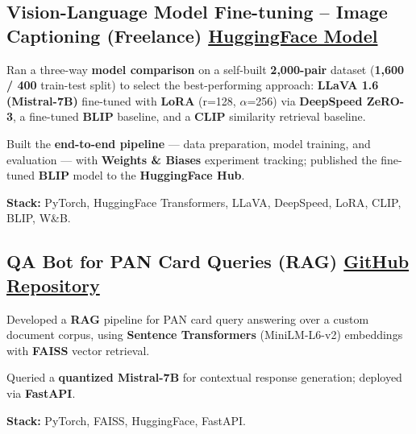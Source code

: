 \documentclass[letter,10pt]{article}
\begin{document}
\subsection{Vision-Language Model Fine-tuning – Image Captioning (Freelance) \hfill \href{https://huggingface.co/sunil448832/blip-model}{HuggingFace Model}}
\begin{zitemize}
\item Ran a three-way \textbf{model comparison} on a self-built \textbf{2{,}000-pair} dataset (\textbf{1{,}600 / 400} train-test split) to select the best-performing approach: \textbf{LLaVA 1.6 (Mistral-7B)} fine-tuned with \textbf{LoRA} (r=128, $\alpha$=256) via \textbf{DeepSpeed ZeRO-3}, a fine-tuned \textbf{BLIP} baseline, and a \textbf{CLIP} similarity retrieval baseline.
\item Built the \textbf{end-to-end pipeline} --- data preparation, model training, and evaluation --- with \textbf{Weights \& Biases} experiment tracking; published the fine-tuned \textbf{BLIP} model to the \textbf{HuggingFace Hub}.
\item \textbf{Stack:} PyTorch, HuggingFace Transformers, LLaVA, DeepSpeed, LoRA, CLIP, BLIP, W\&B.
\end{zitemize}

\subsection{QA Bot for PAN Card Queries (RAG) \hfill \href{https://github.com/sunil448832/Natural-Language-Processing/tree/master/RAG(Retrieval\%20Augment\%20Generation)}{GitHub Repository}}
\begin{zitemize}
\item Developed a \textbf{RAG} pipeline for PAN card query answering over a custom document corpus, using \textbf{Sentence Transformers} (MiniLM-L6-v2) embeddings with \textbf{FAISS} vector retrieval.
\item Queried a \textbf{quantized Mistral-7B} for contextual response generation; deployed via \textbf{FastAPI}.
\item \textbf{Stack:} PyTorch, FAISS, HuggingFace, FastAPI.
\end{zitemize}
\end{document}
